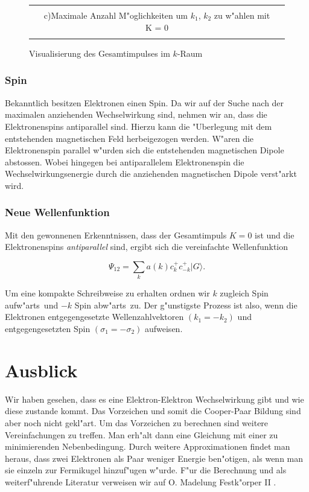 \begin{refsection}
\begin{figure}
\begin{tabular}{l c l}
\begin{minipage}{0.6\textwidth}
    \end{minipage}
    \\
    &
    c)\quad Maximale Anzahl M"oglichkeiten um $k_1$, $k_2$ zu w"ahlen mit K = 0
    \\
    \\
  \end{tabular}
  \caption{Visualisierung des Gesamtimpulses im $k$-Raum
  \label{supraleitung:kRaum}}
\end{figure}

\subsubsection{Spin}
Bekanntlich besitzen Elektronen einen Spin.
Da wir auf der Suche nach der maximalen anziehenden Wechselwirkung sind, nehmen wir an,
dass die Elektronenspins antiparallel sind.
Hierzu kann die "Uberlegung mit dem entstehenden magnetischen Feld herbeigezogen werden.
W"aren die Elektronenspin parallel w"urden sich die entstehenden magnetischen Dipole abstossen.
Wobei hingegen bei antiparallelem Elektronenspin die Wechselwirkungsenergie durch die
anziehenden magnetischen Dipole verst"arkt wird.

\subsubsection{Neue Wellenfunktion}
Mit den gewonnenen Erkenntnissen, dass der Gesamtimpuls $K=0$ ist und die Elektronenspins
{\em antiparallel} sind, ergibt sich die vereinfachte Wellenfunktion

\[
\Psi_{12}=\sum \limits_{k} a(k)c^+_{k}c^+_{-k}|G\rangle.
\]

Um eine kompakte Schreibweise zu erhalten ordnen wir $k$ zugleich \glqq Spin
aufw"arts\grqq~und $-k$ \glqq Spin abw"arts\grqq~zu.
Der g"unstigste Prozess ist also, wenn die Elektronen entgegengesetzte
Wellenzahlvektoren $(k_1 = -k_2)$ und entgegengesetzten Spin $(\sigma_1 = -\sigma_2)$ aufweisen.

\section{Ausblick}
Wir haben gesehen, dass es eine Elektron-Elektron Wechselwirkung gibt und wie diese zustande kommt.
Das Vorzeichen und somit die Cooper-Paar Bildung sind aber noch nicht gekl"art.
Um das Vorzeichen zu berechnen sind weitere Vereinfachungen zu treffen.
Man erh"alt dann eine Gleichung mit einer zu minimierenden Nebenbedingung.
Durch weitere Approximationen findet man heraus,
dass zwei Elektronen als Paar weniger Energie ben"otigen, als wenn man sie einzeln zur Fermikugel
hinzuf"ugen w"urde.
F"ur die Berechnung und als weiterf"uhrende Literatur verweisen wir auf
O. Madelung Festk"orper II \cite{supraleitung:madelung1}.

\printbibliography[heading=subbibliography]
\end{refsection}
